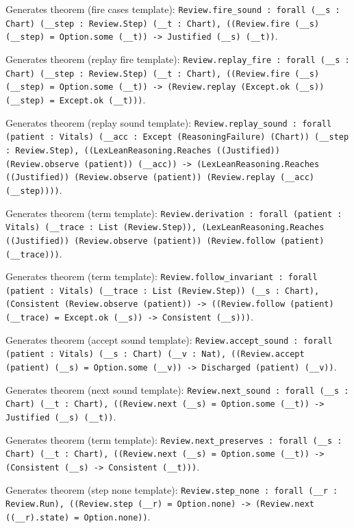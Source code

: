 \documentclass[11pt]{article}
\begin{document}
\noindent Generates theorem (fire cases template): \texttt{Review.fire\_sound : forall (\_\_s : Chart) (\_\_step : Review.Step) (\_\_t : Chart), ((Review.fire (\_\_s) (\_\_step) = Option.some (\_\_t)) -> Justified (\_\_s) (\_\_t))}.\par
\noindent Generates theorem (replay fire template): \texttt{Review.replay\_fire : forall (\_\_s : Chart) (\_\_step : Review.Step) (\_\_t : Chart), ((Review.fire (\_\_s) (\_\_step) = Option.some (\_\_t)) -> (Review.replay (Except.ok (\_\_s)) (\_\_step) = Except.ok (\_\_t)))}.\par
\noindent Generates theorem (replay sound template): \texttt{Review.replay\_sound : forall (patient : Vitals) (\_\_acc : Except (ReasoningFailure) (Chart)) (\_\_step : Review.Step), ((LexLeanReasoning.Reaches ((Justified)) (Review.observe (patient)) (\_\_acc)) -> (LexLeanReasoning.Reaches ((Justified)) (Review.observe (patient)) (Review.replay (\_\_acc) (\_\_step))))}.\par
\noindent Generates theorem (term template): \texttt{Review.derivation : forall (patient : Vitals) (\_\_trace : List (Review.Step)), (LexLeanReasoning.Reaches ((Justified)) (Review.observe (patient)) (Review.follow (patient) (\_\_trace)))}.\par
\noindent Generates theorem (term template): \texttt{Review.follow\_invariant : forall (patient : Vitals) (\_\_trace : List (Review.Step)) (\_\_s : Chart), (Consistent (Review.observe (patient)) -> ((Review.follow (patient) (\_\_trace) = Except.ok (\_\_s)) -> Consistent (\_\_s)))}.\par
\noindent Generates theorem (accept sound template): \texttt{Review.accept\_sound : forall (patient : Vitals) (\_\_s : Chart) (\_\_v : Nat), ((Review.accept (patient) (\_\_s) = Option.some (\_\_v)) -> Discharged (patient) (\_\_v))}.\par
\noindent Generates theorem (next sound template): \texttt{Review.next\_sound : forall (\_\_s : Chart) (\_\_t : Chart), ((Review.next (\_\_s) = Option.some (\_\_t)) -> Justified (\_\_s) (\_\_t))}.\par
\noindent Generates theorem (term template): \texttt{Review.next\_preserves : forall (\_\_s : Chart) (\_\_t : Chart), ((Review.next (\_\_s) = Option.some (\_\_t)) -> (Consistent (\_\_s) -> Consistent (\_\_t)))}.\par
\noindent Generates theorem (step none template): \texttt{Review.step\_none : forall (\_\_r : Review.Run), ((Review.step (\_\_r) = Option.none) -> (Review.next ((\_\_r).state) = Option.none))}.\par
\end{document}
